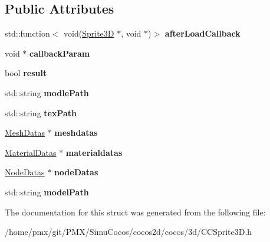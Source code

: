 \subsection*{Public Attributes}
\begin{DoxyCompactItemize}
\item 
\mbox{\label{structSprite3D_1_1AsyncLoadParam_a9cf0613b700b66d67005566a19875ea7}} 
std\+::function$<$ void(\hyperlink{classSprite3D}{Sprite3D} $\ast$, void $\ast$)$>$ {\bfseries after\+Load\+Callback}
\item 
\mbox{\label{structSprite3D_1_1AsyncLoadParam_a3f5eab4770536f42550833150964bc05}} 
void $\ast$ {\bfseries callback\+Param}
\item 
\mbox{\label{structSprite3D_1_1AsyncLoadParam_a1b206dff1943c493e587e291099707a1}} 
bool {\bfseries result}
\item 
\mbox{\label{structSprite3D_1_1AsyncLoadParam_aa6e79645c6bdd935aa8b16636da2a545}} 
std\+::string {\bfseries modle\+Path}
\item 
\mbox{\label{structSprite3D_1_1AsyncLoadParam_a39f7576f233c209ff028399f205a0d40}} 
std\+::string {\bfseries tex\+Path}
\item 
\mbox{\label{structSprite3D_1_1AsyncLoadParam_ae275ae307f596f8f4da1e8290f502695}} 
\hyperlink{structMeshDatas}{Mesh\+Datas} $\ast$ {\bfseries meshdatas}
\item 
\mbox{\label{structSprite3D_1_1AsyncLoadParam_ab73f3a15b5e5338f29fd772076af52bb}} 
\hyperlink{structMaterialDatas}{Material\+Datas} $\ast$ {\bfseries materialdatas}
\item 
\mbox{\label{structSprite3D_1_1AsyncLoadParam_aa4c9198c771176ab810b75450afce84e}} 
\hyperlink{structNodeDatas}{Node\+Datas} $\ast$ {\bfseries node\+Datas}
\item 
\mbox{\label{structSprite3D_1_1AsyncLoadParam_a23d65a3299ec0035851614327be6423b}} 
std\+::string {\bfseries model\+Path}
\end{DoxyCompactItemize}


The documentation for this struct was generated from the following file\+:\begin{DoxyCompactItemize}
\item 
/home/pmx/git/\+P\+M\+X/\+Simu\+Cocos/cocos2d/cocos/3d/C\+C\+Sprite3\+D.\+h\end{DoxyCompactItemize}
